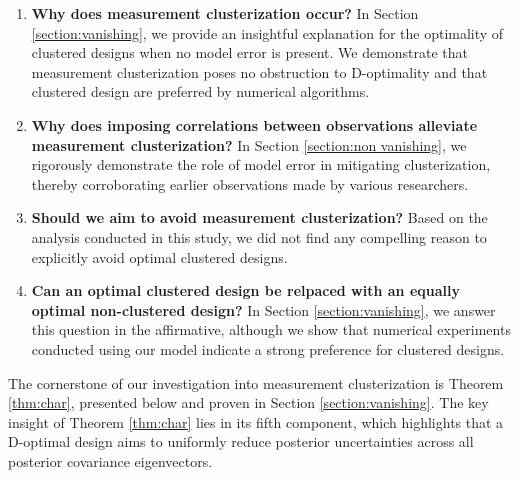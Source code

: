 \begin{enumerate}
\item \label{q:why} \textbf{Why does measurement clusterization
  occur?} In Section \ref{section:vanishing}, we provide an insightful
  explanation for the optimality of clustered designs when no model
  error is present. We demonstrate that measurement clusterization
  poses no obstruction to D-optimality and that clustered design are
  preferred by numerical algorithms.


\item \label{q:mitigate} \textbf{Why does imposing correlations
  between observations alleviate measurement clusterization?} In
  Section \ref{section:non vanishing}, we rigorously demonstrate the
  role of model error in mitigating clusterization, thereby
  corroborating earlier observations made by various researchers.

\item \label{q:avoid} \textbf{Should we aim to avoid measurement
  clusterization?} Based on the analysis conducted in this study, we
  did not find any compelling reason to explicitly avoid optimal
  clustered designs.

\item \label{q:replace} \textbf{Can an optimal clustered design be
  relpaced with an equally optimal non-clustered design?} In Section
  \ref{section:vanishing}, we answer this question in the affirmative,
  although we show that numerical experiments conducted using our
  model indicate a strong preference for clustered designs.
\end{enumerate}

The cornerstone of our investigation into measurement clusterization is
Theorem \ref{thm:char}, presented below and proven in Section
\ref{section:vanishing}. The key insight of Theorem \ref{thm:char}
lies in its fifth component, which highlights that a D-optimal design
aims to uniformly reduce posterior uncertainties across all posterior
covariance eigenvectors.

